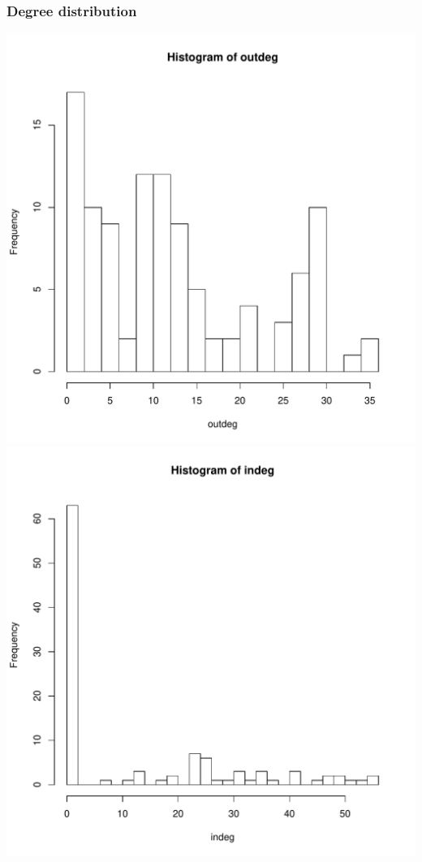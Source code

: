 \documentclass[nopagenumber,9pt]{beamer}
\begin{document}
\begin{frame}
 \frametitle{Degree distribution}
 
 \begin{center}
\includegraphics[scale=.3]{plots/chilean_outdeg.pdf}  
\includegraphics[scale=.3]{plots/chilean_intdeg.pdf}
\end{center}

\end{frame}
\end{document}
